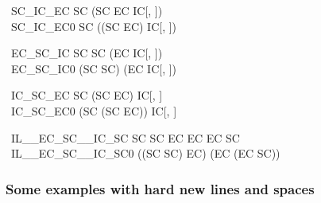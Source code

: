 \documentclass{article}
\begin{document}
\begin{circus}
    \circprocess\ SC\_IC\_EC   \circdef SC \circseq (SC \extchoice EC \intchoice IC[\nat, \nat]) \\
    \circprocess\ SC\_IC\_EC0 \circdef SC \circseq ((SC \extchoice EC) \intchoice IC[\nat, \nat])
\end{circus}

\begin{circus}
    \circprocess\ EC\_SC\_IC   \circdef SC \circseq SC \extchoice (EC \intchoice IC[\nat, \nat]) \\
    \circprocess\ EC\_SC\_IC0 \circdef (SC \circseq SC) \extchoice (EC \intchoice IC[\nat, \nat])
\end{circus}

\begin{circus}
    \circprocess\ IC\_SC\_EC   \circdef SC \circseq (SC \extchoice EC) \intchoice IC[\nat, \nat] \\
    \circprocess\ IC\_SC\_EC0 \circdef (SC \circseq (SC \extchoice EC)) \intchoice IC[\nat, \nat]
\end{circus}

\begin{circus}
    \circprocess\ IL\_\_EC\_SC\_\_IC\_SC   \circdef SC \circseq SC \extchoice EC \interleave EC \intchoice EC \circseq SC \\
    \circprocess\ IL\_\_EC\_SC\_\_IC\_SC0 \circdef ((SC \circseq SC) \extchoice EC) \interleave (EC \intchoice (EC \circseq SC))
\end{circus}

\subsubsection{Some examples with hard new lines and spaces}
\end{document}

